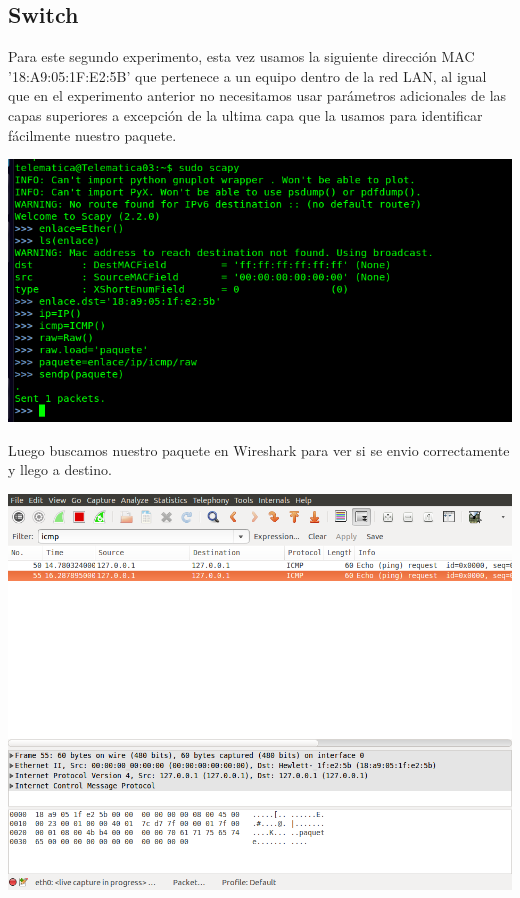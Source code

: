 ﻿\documentclass[spanish]{udpreport}
\begin{document}
\subsection{Switch}

Para este segundo experimento, esta vez usamos la siguiente dirección MAC '18:A9:05:1F:E2:5B' que pertenece a un equipo dentro de la red LAN, al igual que en el experimento anterior no necesitamos usar parámetros adicionales de las capas superiores a excepción de la ultima capa que la usamos para identificar fácilmente nuestro paquete.

\begin{center}
	\includegraphics[scale=.37]{imagenes/Switch/Test_2.png}
\end{center}

Luego buscamos nuestro paquete en Wireshark para ver si se envio correctamente y llego a destino.

\begin{center}
	\includegraphics[scale=.37]{imagenes/Switch/Test_2_Wireshark.png}
\end{center}
\end{document}
